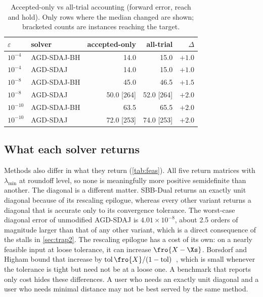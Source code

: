 \begin{table}[t]
\centering
\caption{Accepted-only vs all-trial accounting (forward error, reach and
hold). Only rows where the median changed are shown; bracketed counts are
instances reaching the target.}
\label{tab:acct}
\begin{tabular}{llrrr}
\toprule
$\varepsilon$ & solver & accepted-only & all-trial & $\Delta$\\
\midrule
$10^{-4}$  & AGD-SDAJ-BH & 14.0 & 15.0 & $+1.0$\\
$10^{-4}$  & AGD-SDAJ    & 14.0 & 15.0 & $+1.0$\\
$10^{-8}$  & AGD-SDAJ-BH & 45.0 & 46.5 & $+1.5$\\
$10^{-8}$  & AGD-SDAJ    & 50.0 [264] & 52.0 [264] & $+2.0$\\
$10^{-10}$ & AGD-SDAJ-BH & 63.5 & 65.5 & $+2.0$\\
$10^{-10}$ & AGD-SDAJ    & 72.0 [253] & 74.0 [253] & $+2.0$\\
\bottomrule
\end{tabular}
\end{table}

\subsection{What each solver returns}\label{sec:returned}
Methods also differ in what they return (\cref{tab:feas}). All five return
matrices with $\lambda_{\min}$ at roundoff level, so none is meaningfully more
positive semidefinite than another. The diagonal is a different matter.
SBB-Dual returns an exactly unit diagonal because of its rescaling epilogue,
whereas every other variant returns a diagonal that is accurate only to its
convergence tolerance. The worst-case diagonal error of unmodified AGD-SDAJ
is $4.01\times10^{-8}$, about 2.5 orders of magnitude larger than that of any
other variant, which is a direct consequence of the stalls in
\cref{sec:trap2}. The rescaling epilogue has a cost of its own: on a
nearly feasible input at loose tolerance, it can increase $\fro{X-\Xs}$.
Borsdorf and Higham bound that increase by
$\mathrm{tol}\,\fro{X}/(1-\mathrm{tol})$~\cite[Lem.~3.2]{borsdorf2010preconditioned},
which is small whenever the tolerance is tight but need not be at a loose
one.
A benchmark that reports only cost hides these differences. A user who needs
an exactly unit diagonal and a user who needs minimal distance may not be
best served by the same method.

